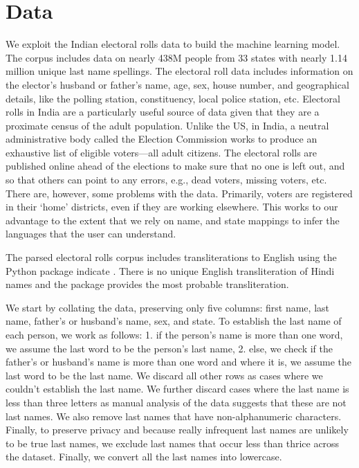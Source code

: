 \documentclass[11pt,  letterpaper]{article}
\begin{document}







\section{Data}

We exploit the Indian electoral rolls data \citep{DVN/OG47IV_2023, DVN/MUEGDT_2018} to build the machine learning model. The corpus includes data on nearly 438M people from 33 states with nearly 1.14 million unique last name spellings. The electoral roll data includes information on the elector's husband or father’s name, age, sex, house number, and geographical details, like the polling station, constituency, local police station, etc. Electoral rolls in India are a particularly useful source of data given that they are a proximate census of the adult population. Unlike the US, in India, a neutral administrative body called the Election Commission works to produce an exhaustive list of eligible voters—all adult citizens. The electoral rolls are published online ahead of the elections to make sure that no one is left out, and so that others can point to any errors, e.g., dead voters, missing voters, etc. There are, however, some problems with the data. Primarily, voters are registered in their `home' districts, even if they are working elsewhere. This works to our advantage to the extent that we rely on name, and state mappings to infer the languages that the user can understand.

The parsed electoral rolls corpus \citep{DVN/MUEGDT_2018} includes transliterations to English using the Python package indicate \citep{Chintalapati_Indicate_Transliterate_Indic_2022}. There is no unique English transliteration of Hindi names and the package provides the most probable transliteration.

We start by collating the data, preserving only five columns: first name, last name, father's or husband's name, sex, and state. To establish the last name of each person, we work as follows: 1. if the person's name is more than one word, we assume the last word to be the person's last name, 2. else, we check if the father's or husband's name is more than one word and where it is, we assume the last word to be the last name. We discard all other rows as cases where we couldn't establish the last name. We further discard cases where the last name is less than three letters as manual analysis of the data suggests that these are not last names. We also remove last names that have non-alphanumeric characters. Finally, to preserve privacy and because really infrequent last names are unlikely to be true last names, we exclude last names that occur less than thrice across the dataset. Finally, we convert all the last names into lowercase.
\end{document}
